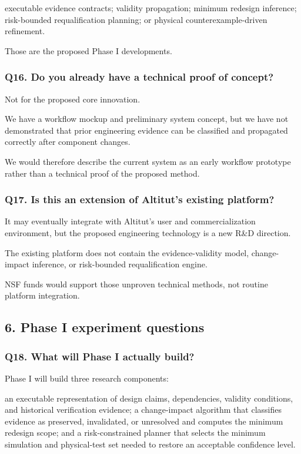 \documentclass[12pt,letterpaper]{article}
\begin{document}
executable evidence contracts;
validity propagation;
minimum redesign inference;
risk-bounded requalification planning; or
physical counterexample-driven refinement.

Those are the proposed Phase I developments.

\subsubsection{Q16. Do you already have a technical proof of concept?}

Not for the proposed core innovation.

We have a workflow mockup and preliminary system concept, but we have not demonstrated that prior engineering evidence can be classified and propagated correctly after component changes.

We would therefore describe the current system as an early workflow prototype rather than a technical proof of the proposed method.

\subsubsection{Q17. Is this an extension of Altitut's existing platform?}

It may eventually integrate with Altitut's user and commercialization environment, but the proposed engineering technology is a new R&D direction.

The existing platform does not contain the evidence-validity model, change-impact inference, or risk-bounded requalification engine.

NSF funds would support those unproven technical methods, not routine platform integration.

\subsection{6. Phase I experiment questions}
\subsubsection{Q18. What will Phase I actually build?}

Phase I will build three research components:

an executable representation of design claims, dependencies, validity conditions, and historical verification evidence;
a change-impact algorithm that classifies evidence as preserved, invalidated, or unresolved and computes the minimum redesign scope; and
a risk-constrained planner that selects the minimum simulation and physical-test set needed to restore an acceptable confidence level.
\end{document}
